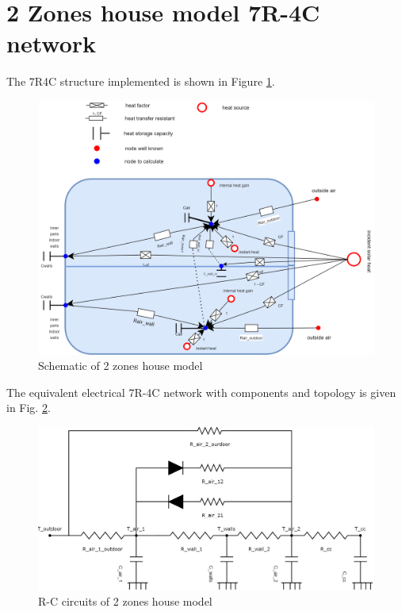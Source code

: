 \section{2 Zones house model 7R-4C network}

The 7R4C structure implemented is shown in Figure \ref{fig:schematic7R4C}.
	
\begin{figure}[H]
	\centering
	\includegraphics[width=1.0\columnwidth]{Pictures/House_electrical_circuits overview.png}
	\caption[Short title]{Schematic of 2 zones house model}
	\label{fig:schematic7R4C}
	\end{figure} 
	
The equivalent electrical 7R-4C network with components and topology is given in Fig. \ref{fig:eq7R4C}.

\begin{figure}[H]
	\centering
	\includegraphics[width=1.0\columnwidth]{Pictures/2_Zones_house_circuits.png}
	\caption[Short title]{R-C circuits of 2 zones house model}
	\label{fig:eq7R4C}
	\end{figure}

